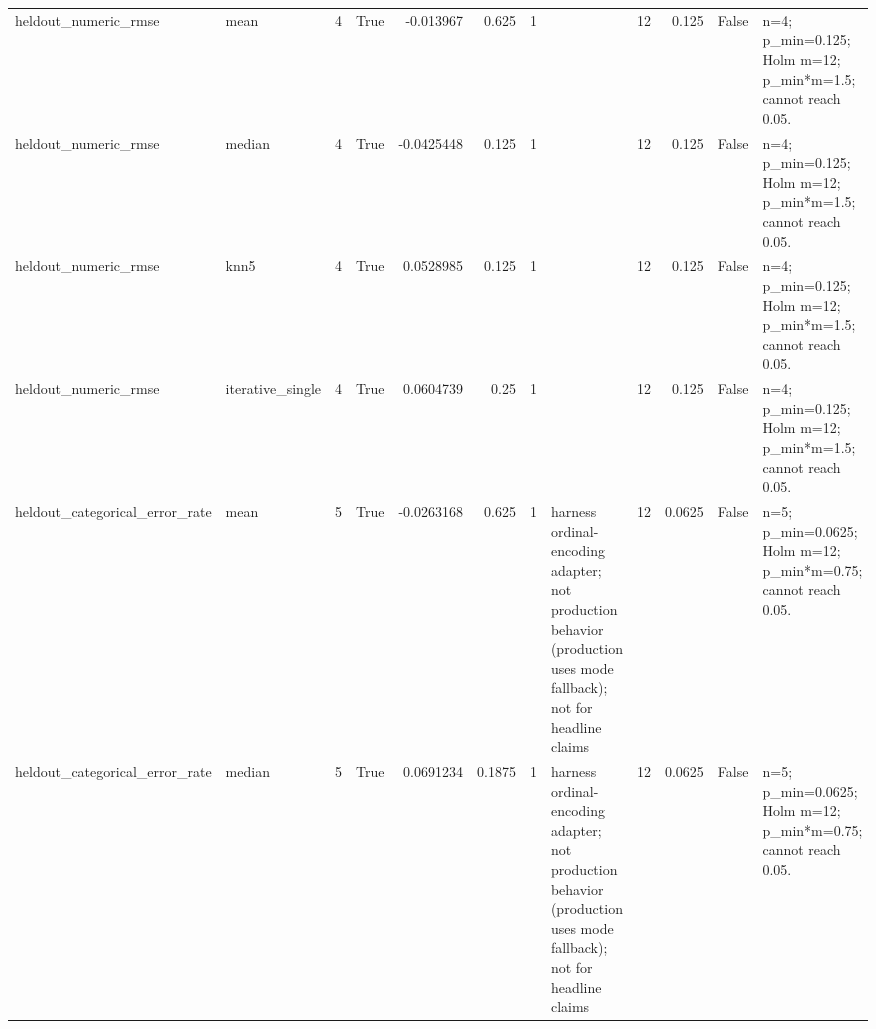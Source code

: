 \begin{table}[ht]
{\begin{tabular}{llrlrrrlrrll}
 heldout\_numeric\_rmse           & mean             &            4 & True                &     -0.013967    &    0.625  &     1    &                                                                                                                    &                             12 &                            0.125   & False                       & n=4; p\_min=0.125; Holm m=12; p\_min*m=1.5; cannot reach 0.05.     \\
 heldout\_numeric\_rmse           & median           &            4 & True                &     -0.0425448   &    0.125  &     1    &                                                                                                                    &                             12 &                            0.125   & False                       & n=4; p\_min=0.125; Holm m=12; p\_min*m=1.5; cannot reach 0.05.     \\
 heldout\_numeric\_rmse           & knn5             &            4 & True                &      0.0528985   &    0.125  &     1    &                                                                                                                    &                             12 &                            0.125   & False                       & n=4; p\_min=0.125; Holm m=12; p\_min*m=1.5; cannot reach 0.05.     \\
 heldout\_numeric\_rmse           & iterative\_single &            4 & True                &      0.0604739   &    0.25   &     1    &                                                                                                                    &                             12 &                            0.125   & False                       & n=4; p\_min=0.125; Holm m=12; p\_min*m=1.5; cannot reach 0.05.     \\
 heldout\_categorical\_error\_rate & mean             &            5 & True                &     -0.0263168   &    0.625  &     1    & harness ordinal-encoding adapter; not production behavior (production uses mode fallback); not for headline claims &                             12 &                            0.0625  & False                       & n=5; p\_min=0.0625; Holm m=12; p\_min*m=0.75; cannot reach 0.05.   \\
 heldout\_categorical\_error\_rate & median           &            5 & True                &      0.0691234   &    0.1875 &     1    & harness ordinal-encoding adapter; not production behavior (production uses mode fallback); not for headline claims &                             12 &                            0.0625  & False                       & n=5; p\_min=0.0625; Holm m=12; p\_min*m=0.75; cannot reach 0.05.   \\

\end{tabular}}
\end{table}
